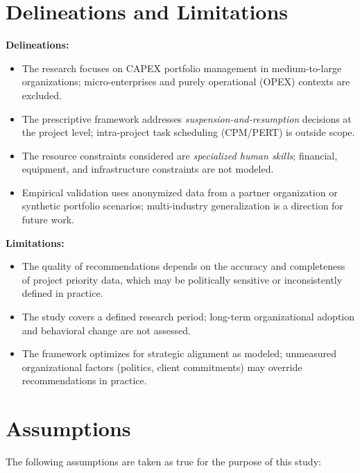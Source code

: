 \section{Delineations and Limitations}
\label{sec:delineations}

\textbf{Delineations:}
\begin{itemize}
  \item The research focuses on CAPEX portfolio management in medium-to-large organizations;
        micro-enterprises and purely operational (OPEX) contexts are excluded.
  \item The prescriptive framework addresses \textit{suspension-and-resumption} decisions at
        the project level; intra-project task scheduling (CPM/PERT) is outside scope.
  \item The resource constraints considered are \textit{specialized human skills}; financial,
        equipment, and infrastructure constraints are not modeled.
  \item Empirical validation uses anonymized data from a partner organization or synthetic
        portfolio scenarios; multi-industry generalization is a direction for future work.
\end{itemize}

\textbf{Limitations:}
\begin{itemize}
  \item The quality of recommendations depends on the accuracy and completeness of project
        priority data, which may be politically sensitive or inconsistently defined in practice.
  \item The study covers a defined research period; long-term organizational adoption and
        behavioral change are not assessed.
  \item The framework optimizes for strategic alignment as modeled; unmeasured organizational
        factors (politics, client commitments) may override recommendations in practice.
\end{itemize}

\section{Assumptions}
\label{sec:assumptions}

The following assumptions are taken as true for the purpose of this study:


